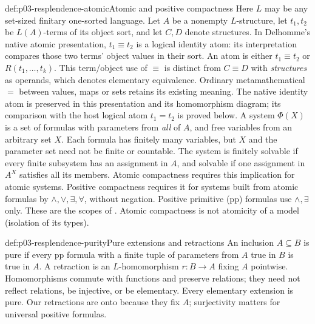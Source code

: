 \begin{hbdefinition}{def:p03-resplendence-atomic}{Atomic and positive compactness}
Here \(L\) may be any set-sized finitary one-sorted language.
Let \(A\) be a nonempty \(L\)-structure, let \(t_1,t_2\) be
\(L(A)\)-terms of its object sort, and let \(C,D\) denote structures.
In Delhomme's native atomic presentation, \(t_1\equiv t_2\) is a
logical identity atom: its interpretation compares those two terms'
object values in their sort.
An atom is either \(t_1\equiv t_2\) or \(R(t_1,\ldots,t_k)\).
This term/object use of \(\equiv\) is distinct from
\(C\equiv D\) with \emph{structures} as operands, which denotes
elementary equivalence. Ordinary metamathematical \(=\) between values,
maps or sets retains its existing meaning. The native identity atom is
preserved in this presentation and its homomorphism diagram; its comparison
with the host logical atom \(t_1=t_2\) is proved below.
A system
\(\Phi(X)\) is a set of formulas with parameters from \emph{all} of
\(A\), and free variables from an arbitrary set \(X\). Each formula
has finitely many variables, but \(X\) and the parameter set need not be
finite or countable. The system is finitely solvable if every finite
subsystem has an assignment in \(A\), and solvable if one assignment
in \(A^X\) satisfies all its members. Atomic compactness requires this
implication for atomic systems. Positive compactness requires it for
systems built from atomic formulas by \(\land,\lor,\exists,\forall\),
without negation. Positive primitive (pp) formulas use \(\land,\exists\)
only. These are the scopes of \cite[\S2]{Delhomme1999AtomicGraphs}.
Atomic compactness is not atomicity of a model (isolation of its types).
\end{hbdefinition}

\begin{hbdefinition}{def:p03-resplendence-purity}{Pure extensions and retractions}
An inclusion \(A\subseteq B\) is pure if every pp formula with a finite
tuple of parameters from \(A\) true in \(B\) is true in \(A\).
A retraction is an \(L\)-homomorphism \(r:B\to A\) fixing \(A\)
pointwise. Homomorphisms commute with functions and preserve relations;
they need not reflect relations, be injective, or be elementary.
Every elementary extension is pure. Our retractions are onto because
they fix \(A\); surjectivity matters for universal positive formulas.
\end{hbdefinition}

